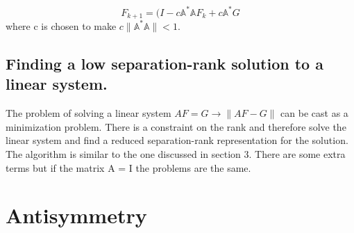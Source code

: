 \documentclass[10pt, draft]{article}
\begin{document}
 \[F_{k+1}=(I - c\mathbb{A}^*\mathbb{A}F_k + c\mathbb{A}^*G\]
 where c is chosen to make $c\|\mathbb{A}^*\mathbb{A}\| <1$.\linebreak[1]
 
 \subsection{Finding a low separation-rank solution to a linear system.}
 The problem of solving a linear system $AF=G \rightarrow \|AF -G\|$ can be cast as a minimization problem.  There is a constraint on the rank and therefore solve the linear system and find a reduced separation-rank representation for the solution.  The algorithm is similar to the one discussed in section 3.  There are some extra terms but if the matrix A = I the problems are the same.
 
 \section{Antisymmetry}
 
 
\end{document}

